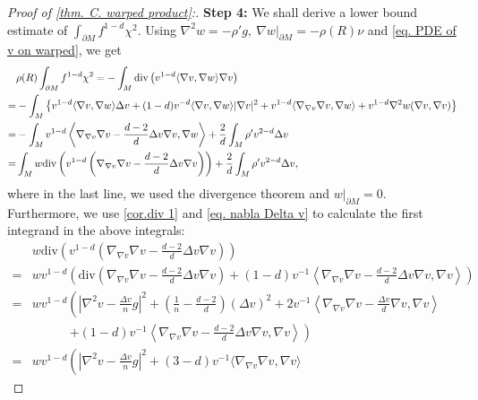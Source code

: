 \documentclass[12pt]{amsart}%
\numberwithin{equation}{section}
\numberwithin{lemma}{section}
\numberwithin{proposition}{section}
\numberwithin{corollary}{section}
\numberwithin{remark}{section}
\begin{document}
\begin{proof}[Proof of \cref{thm. C. warped product}:]
    \textbf{Step 4:} We shall derive a lower bound estimate of $\int_{\partial M}f^{1-d}\chi^2$. Using $\nabla^2 w=-\rho'g,\ \nabla w|_{\partial M}=-\rho(R)\nu$ and \cref{eq. PDE of v on warped}, we get
    \begin{align*}
        &\rho(R)\int_{\partial M}f^{1-d}\chi^2
        =-\int_{M}\mathrm{div}\left(v^{1-d}\langle \nabla v,\nabla w\rangle\nabla v\right)\notag\\
        =&-\int_{M}\left\{v^{1-d}\langle \nabla v,\nabla w\rangle\Delta v+(1-d)v^{-d}\langle \nabla v,\nabla w\rangle|\nabla v|^2
        +v^{1-d}\langle\nabla_{\nabla v}\nabla v,\nabla w\rangle
        +v^{1-d}\nabla^2 w(\nabla v,\nabla v)\right\}\notag\\
        =&-\int_{M}v^{1-d}
        \left\langle\nabla_{\nabla v}\nabla v-\frac{d-2}{d}\Delta v\nabla v,\nabla w\right\rangle
        +\frac{2}{d}\int_{M}\rho'v^{2-d}\Delta v\notag\\
        =&\int_{M}
        w\mathrm{div}\left(
        v^{1-d}
        \left(\nabla_{\nabla v}\nabla v-\frac{d-2}{d}\Delta v\nabla v\right)
        \right)
        +\frac{2}{d}\int_{M}\rho'v^{2-d}\Delta v,
    \end{align*}
    where in the last line, we used the divergence theorem and $w|_{\partial M}=0.$
    Furthermore, we use \cref{cor.div 1} and \cref{eq. nabla Delta v} to calculate the first integrand in the above integrals:
    \begin{align*}
        &w\mathrm{div}\left(
        v^{1-d}
        \left(\nabla_{\nabla v}\nabla v-\frac{d-2}{d}\Delta v\nabla v\right)
        \right)\\
        =&wv^{1-d}\left(
            \mathrm{div}
            \left(\nabla_{\nabla v}\nabla v-\frac{d-2}{d}\Delta v\nabla v\right)
            +(1-d)v^{-1}
            \left\langle \nabla_{\nabla v}\nabla v-\frac{d-2}{d}\Delta v\nabla v,\nabla v\right\rangle
        \right)\\
        =&wv^{1-d}\left(
        \left|\nabla^2 v-\frac{\Delta v}{n}g\right|^2
        +\left(\frac{1}{n}-\frac{d-2}{d}\right)
        (\Delta v)^2
        +2v^{-1}
        \left\langle \nabla_{\nabla v}\nabla v-\frac{\Delta v}{d}\nabla v,\nabla v\right\rangle\right.\\
        &\quad\quad\quad\left.
        +(1-d)v^{-1}\left\langle \nabla_{\nabla v}\nabla v-\frac{d-2}{d}\Delta v\nabla v,\nabla v\right\rangle
        \right)\\
        =&wv^{1-d}\left(
        \left|\nabla^2 v-\frac{\Delta v}{n}g\right|^2
        +(3-d)v^{-1}\langle \nabla_{\nabla v}\nabla v,\nabla v\rangle

\end{align*}
\end{proof}
\end{document}
